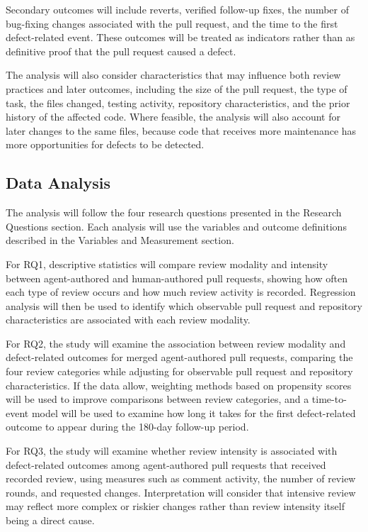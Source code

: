 \documentclass[stu,12pt,donotrepeattitle]{apa7}
\begin{document}
Secondary outcomes will include reverts, verified follow-up fixes, the number of bug-fixing changes associated with the pull request, and the time to the first defect-related event. These outcomes will be treated as indicators rather than as definitive proof that the pull request caused a defect.

The analysis will also consider characteristics that may influence both review practices and later outcomes, including the size of the pull request, the type of task, the files changed, testing activity, repository characteristics, and the prior history of the affected code. Where feasible, the analysis will also account for later changes to the same files, because code that receives more maintenance has more opportunities for defects to be detected.

\subsection{Data Analysis}

The analysis will follow the four research questions presented in the Research Questions section. Each analysis will use the variables and outcome definitions described in the Variables and Measurement section.

For RQ1, descriptive statistics will compare review modality and intensity between agent-authored and human-authored pull requests, showing how often each type of review occurs and how much review activity is recorded. Regression analysis will then be used to identify which observable pull request and repository characteristics are associated with each review modality.

For RQ2, the study will examine the association between review modality and defect-related outcomes for merged agent-authored pull requests, comparing the four review categories while adjusting for observable pull request and repository characteristics. If the data allow, weighting methods based on propensity scores \parencite{rosenbaum1983} will be used to improve comparisons between review categories, and a time-to-event model will be used to examine how long it takes for the first defect-related outcome to appear during the 180-day follow-up period.

For RQ3, the study will examine whether review intensity is associated with defect-related outcomes among agent-authored pull requests that received recorded review, using measures such as comment activity, the number of review rounds, and requested changes. Interpretation will consider that intensive review may reflect more complex or riskier changes rather than review intensity itself being a direct cause.
\end{document}
